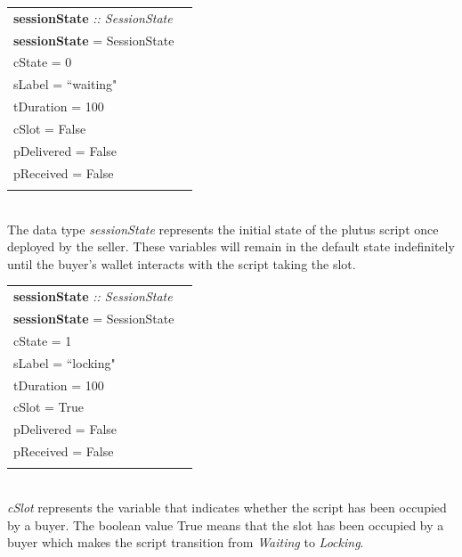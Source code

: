 \documentclass[12pt]{article}
\begin{document}
\begin{tabular}{lr}
\textbf{sessionState} \emph{:: SessionState}\\
\textbf{sessionState}  = SessionState  \textbraceleft{}
\\ \hspace{55mm}cState = 0
\\ \hspace{55mm}sLabel = ``waiting"
\\ \hspace{55mm}tDuration = 100
\\ \hspace{55mm}cSlot = False
\\ \hspace{55mm}pDelivered = False
\\ \hspace{55mm}pReceived = False
\\\hspace{51mm}\textbraceright{} 
\end{tabular}
\\

 The data type \emph{sessionState} represents the initial state of the plutus script once deployed by the seller. These variables will remain in the default state indefinitely until the buyer's wallet interacts with the script taking the slot.
\\

\begin{tabular}{lr}
\textbf{sessionState} \emph{:: SessionState}\\
\textbf{sessionState}  = SessionState  \textbraceleft{}
\\ \hspace{55mm}cState = 1
\\ \hspace{55mm}sLabel = ``locking"
\\ \hspace{55mm}tDuration = 100
\\ \hspace{55mm}cSlot = True
\\ \hspace{55mm}pDelivered = False
\\ \hspace{55mm}pReceived = False
\\\hspace{51mm}\textbraceright{} 
\end{tabular}
\\

 \emph{cSlot} represents the variable that indicates whether the script has been occupied by a buyer. The boolean value True means that the slot has been occupied by a buyer which makes the script transition from \emph{Waiting} to \emph{Locking}.
\\
\end{document}
